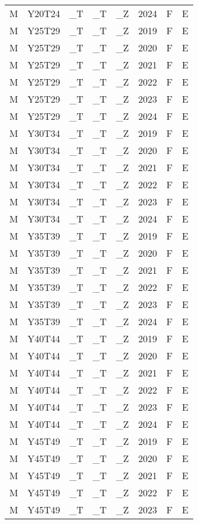 \begin{longtable}[t]{llllllll}
M & Y20T24 & \_T & \_T & \_Z & 2024 & F & E\\
M & Y25T29 & \_T & \_T & \_Z & 2019 & F & E\\
M & Y25T29 & \_T & \_T & \_Z & 2020 & F & E\\
\addlinespace
M & Y25T29 & \_T & \_T & \_Z & 2021 & F & E\\
M & Y25T29 & \_T & \_T & \_Z & 2022 & F & E\\
M & Y25T29 & \_T & \_T & \_Z & 2023 & F & E\\
M & Y25T29 & \_T & \_T & \_Z & 2024 & F & E\\
M & Y30T34 & \_T & \_T & \_Z & 2019 & F & E\\
\addlinespace
M & Y30T34 & \_T & \_T & \_Z & 2020 & F & E\\
M & Y30T34 & \_T & \_T & \_Z & 2021 & F & E\\
M & Y30T34 & \_T & \_T & \_Z & 2022 & F & E\\
M & Y30T34 & \_T & \_T & \_Z & 2023 & F & E\\
M & Y30T34 & \_T & \_T & \_Z & 2024 & F & E\\
\addlinespace
M & Y35T39 & \_T & \_T & \_Z & 2019 & F & E\\
M & Y35T39 & \_T & \_T & \_Z & 2020 & F & E\\
M & Y35T39 & \_T & \_T & \_Z & 2021 & F & E\\
M & Y35T39 & \_T & \_T & \_Z & 2022 & F & E\\
M & Y35T39 & \_T & \_T & \_Z & 2023 & F & E\\
\addlinespace
M & Y35T39 & \_T & \_T & \_Z & 2024 & F & E\\
M & Y40T44 & \_T & \_T & \_Z & 2019 & F & E\\
M & Y40T44 & \_T & \_T & \_Z & 2020 & F & E\\
M & Y40T44 & \_T & \_T & \_Z & 2021 & F & E\\
M & Y40T44 & \_T & \_T & \_Z & 2022 & F & E\\
\addlinespace
M & Y40T44 & \_T & \_T & \_Z & 2023 & F & E\\
M & Y40T44 & \_T & \_T & \_Z & 2024 & F & E\\
M & Y45T49 & \_T & \_T & \_Z & 2019 & F & E\\
M & Y45T49 & \_T & \_T & \_Z & 2020 & F & E\\
M & Y45T49 & \_T & \_T & \_Z & 2021 & F & E\\
\addlinespace
M & Y45T49 & \_T & \_T & \_Z & 2022 & F & E\\
M & Y45T49 & \_T & \_T & \_Z & 2023 & F & E\\

\end{longtable}
